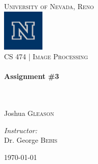 \begin{titlepage}
\begin{center}

\textsc{\LARGE University of Nevada, Reno}\\[.5cm]
\includegraphics[width=0.15\textwidth]{./logo.png}\\[.5cm]

\textsc{\large CS 474 | Image Processing } \\[.5cm]

\HRule \\[0.4cm]
{ \huge \bfseries Assignment \#3}\\[0.4cm]

\HRule \\[1.5cm]

\begin{minipage}{0.4\textwidth}
  \begin{flushleft} \large
    \emph{}\\
    Joshua \textsc{Gleason}\\
  \end{flushleft}
\end{minipage}
\begin{minipage}{0.4\textwidth}
  \begin{flushright} \large
    \emph{Instructor:} \\
    Dr. George \textsc{Bebis}
  \end{flushright}
\end{minipage}

\vspace*{\fill}



\vspace*{\fill}

{\large \today}

\end{center}

\end{titlepage}

